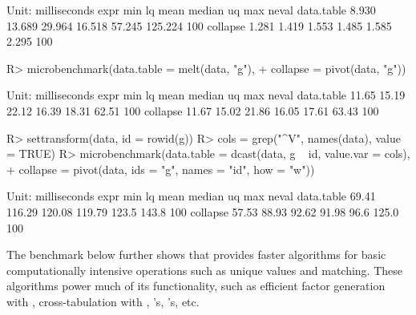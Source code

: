 \documentclass[article]{jss}
\newcommand{\fct}[1]{\code{#1()}}
\begin{document}
\begin{Schunk}
\begin{Sinput}
\end{Sinput}
\begin{Soutput}
Unit: milliseconds
       expr   min     lq   mean median     uq     max neval
 data.table 8.930 13.689 29.964 16.518 57.245 125.224   100
   collapse 1.281  1.419  1.553  1.485  1.585   2.295   100
\end{Soutput}
\begin{Sinput}
R> microbenchmark(data.table = melt(data, "g"),
+                 collapse = pivot(data, "g"))
\end{Sinput}
\begin{Soutput}
Unit: milliseconds
       expr   min    lq  mean median    uq   max neval
 data.table 11.65 15.19 22.12  16.39 18.31 62.51   100
   collapse 11.67 15.02 21.86  16.05 17.61 63.43   100
\end{Soutput}
\begin{Sinput}
R> settransform(data, id = rowid(g))
R> cols = grep("^V", names(data), value = TRUE)
R> microbenchmark(data.table = dcast(data, g ~ id, value.var = cols),
+            collapse = pivot(data, ids = "g", names = "id", how = "w"))
\end{Sinput}
\begin{Soutput}
Unit: milliseconds
       expr   min     lq   mean median    uq   max neval
 data.table 69.41 116.29 120.08 119.79 123.5 143.8   100
   collapse 57.53  88.93  92.62  91.98  96.6 125.0   100
\end{Soutput}
\end{Schunk}
%
The benchmark below further shows that  provides faster algorithms for basic computationally intensive operations such as unique values and matching. These algorithms power much of its functionality, such as efficient factor generation with \fct{qF}, cross-tabulation with \fct{qtab}, \fct{join}'s, \fct{pivot}'s, etc.
%
\end{document}
